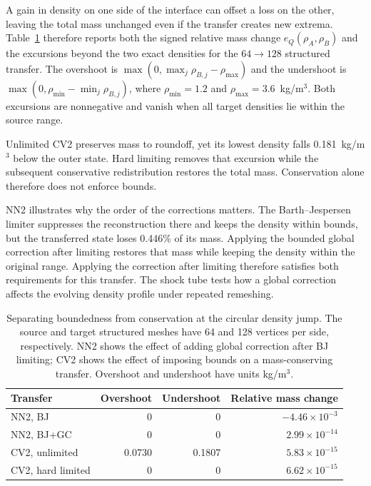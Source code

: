 \documentclass[a4paper,fleqn]{cas-sc}
\begin{document}
\label{sec:results-boundedness}
A gain in density on one side of the interface can offset a loss on the other, leaving the total mass unchanged even if the transfer creates new extrema. Table~\ref{tab:disc-selected} therefore reports both the signed relative mass change $e_Q(\rho_A,\rho_B)$ and the excursions beyond the two exact densities for the $64\to128$ structured transfer. The overshoot is $\max(0,\max_j\rho_{B,j}-\rho_{\max})$ and the undershoot is $\max(0,\rho_{\min}-\min_j\rho_{B,j})$, where $\rho_{\min}=1.2$ and $\rho_{\max}=3.6$~kg/m$^3$. Both excursions are nonnegative and vanish when all target densities lie within the source range.

Unlimited CV2 preserves mass to roundoff, yet its lowest density falls 0.181~kg/m$^3$ below the outer state. Hard limiting removes that excursion while the subsequent conservative redistribution restores the total mass. Conservation alone therefore does not enforce bounds.

NN2 illustrates why the order of the corrections matters. The Barth--Jespersen limiter suppresses the reconstruction there and keeps the density within bounds, but the transferred state loses 0.446\% of its mass. Applying the bounded global correction after limiting restores that mass while keeping the density within the original range. Applying the correction after limiting therefore satisfies both requirements for this transfer. The shock tube tests how a global correction affects the evolving density profile under repeated remeshing.

\begin{table}[pos=htbp]
\centering\small
\caption{Separating boundedness from conservation at the circular density jump. The source and target structured meshes have 64 and 128 vertices per side, respectively. NN2 shows the effect of adding global correction after BJ limiting; CV2 shows the effect of imposing bounds on a mass-conserving transfer. Overshoot and undershoot have units kg/m$^3$.}
\label{tab:disc-selected}
\begin{tabular}{@{}lrrr@{}}
\toprule
Transfer & Overshoot & Undershoot & Relative mass change\\
\midrule
NN2, BJ & 0 & 0 & $-4.46\times10^{-3}$\\
NN2, BJ+GC & 0 & 0 & $2.99\times10^{-14}$\\
CV2, unlimited & 0.0730 & 0.1807 & $5.83\times10^{-15}$\\
CV2, hard limited & 0 & 0 & $6.62\times10^{-15}$\\
\bottomrule
\end{tabular}
\end{table}
\end{document}
